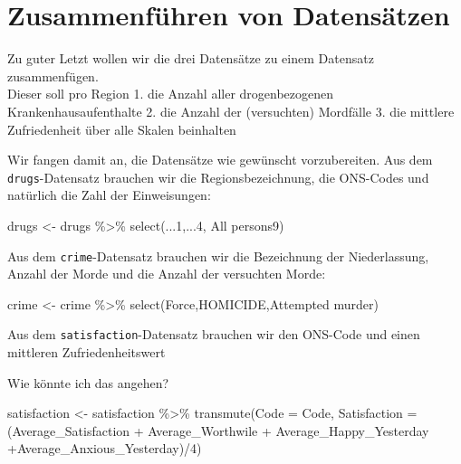 \documentclass[
]{book}
\newenvironment{Shaded}{\begin{snugshade}}{\end{snugshade}}
\newcommand{\AttributeTok}[1]{\textcolor[rgb]{0.77,0.63,0.00}{#1}}
\newcommand{\DecValTok}[1]{\textcolor[rgb]{0.00,0.00,0.81}{#1}}
\newcommand{\FunctionTok}[1]{\textcolor[rgb]{0.00,0.00,0.00}{#1}}
\newcommand{\NormalTok}[1]{#1}
\newcommand{\OtherTok}[1]{\textcolor[rgb]{0.56,0.35,0.01}{#1}}
\newcommand{\SpecialCharTok}[1]{\textcolor[rgb]{0.00,0.00,0.00}{#1}}
\newcommand{\StringTok}[1]{\textcolor[rgb]{0.31,0.60,0.02}{#1}}
\begin{document}
\hypertarget{zusammenfuxfchren-von-datensuxe4tzen}{%
\section{Zusammenführen von Datensätzen}\label{zusammenfuxfchren-von-datensuxe4tzen}}

Zu guter Letzt wollen wir die drei Datensätze zu einem Datensatz zusammenfügen.\\
Dieser soll pro Region
1. die Anzahl aller drogenbezogenen Krankenhausaufenthalte
2. die Anzahl der (versuchten) Mordfälle
3. die mittlere Zufriedenheit über alle Skalen beinhalten

Wir fangen damit an, die Datensätze wie gewünscht vorzubereiten.
Aus dem \texttt{drugs}-Datensatz brauchen wir die Regionsbezeichnung, die ONS-Codes und natürlich die Zahl der Einweisungen:

\begin{Shaded}
\begin{Highlighting}[]
\NormalTok{drugs }\OtherTok{\textless{}{-}}\NormalTok{ drugs }\SpecialCharTok{\%\textgreater{}\%} 
  \FunctionTok{select}\NormalTok{(...}\DecValTok{1}\NormalTok{,...}\DecValTok{4}\NormalTok{, }\StringTok{\textasciigrave{}}\AttributeTok{All persons9}\StringTok{\textasciigrave{}}\NormalTok{)}
\end{Highlighting}
\end{Shaded}

Aus dem \texttt{crime}-Datensatz brauchen wir die Bezeichnung der Niederlassung, Anzahl der Morde und die Anzahl der versuchten Morde:

\begin{Shaded}
\begin{Highlighting}[]
\NormalTok{crime }\OtherTok{\textless{}{-}}\NormalTok{ crime }\SpecialCharTok{\%\textgreater{}\%} 
  \FunctionTok{select}\NormalTok{(Force,HOMICIDE,}\StringTok{\textasciigrave{}}\AttributeTok{Attempted murder}\StringTok{\textasciigrave{}}\NormalTok{)}
\end{Highlighting}
\end{Shaded}

Aus dem \texttt{satisfaction}-Datensatz brauchen wir den ONS-Code und einen mittleren Zufriedenheitswert

Wie könnte ich das angehen?

\begin{Shaded}
\begin{Highlighting}[]
\NormalTok{satisfaction }\OtherTok{\textless{}{-}}\NormalTok{ satisfaction }\SpecialCharTok{\%\textgreater{}\%} 
  \FunctionTok{transmute}\NormalTok{(}\AttributeTok{Code =}\NormalTok{ Code,}
            \AttributeTok{Satisfaction =}\NormalTok{ (Average\_Satisfaction }\SpecialCharTok{+}\NormalTok{ Average\_Worthwile }\SpecialCharTok{+} 
\NormalTok{              Average\_Happy\_Yesterday }\SpecialCharTok{+}\NormalTok{Average\_Anxious\_Yesterday)}\SpecialCharTok{/}\DecValTok{4}\NormalTok{)}
\end{Highlighting}
\end{Shaded}
\end{document}
